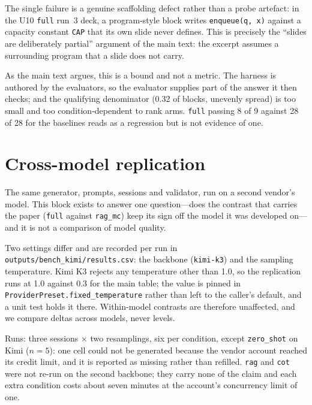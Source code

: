 \documentclass[11pt,a4paper]{article}
\newcommand{\id}[1]{\texttt{#1}}
\begin{document}
The single failure is a genuine scaffolding defect rather than a probe artefact:
in the U10 \id{full} run~3 deck, a program-style block writes
\id{enqueue(q, x)} against a capacity constant \id{CAP} that its own slide never
defines. This is precisely the ``slides are deliberately partial'' argument of
the main text: the excerpt assumes a surrounding program that a slide does not
carry.

As the main text argues, this is a bound and not a metric. The harness is
authored by the evaluators, so the evaluator supplies part of the answer it then
checks; and the qualifying denominator (0.32 of blocks, unevenly spread) is too
small and too condition-dependent to rank arms. \id{full} passing 8 of 9 against
28 of 28 for the baselines reads as a regression but is not evidence of one.

\section{Cross-model replication}
\label{sec:s4}

The same generator, prompts, sessions and validator, run on a second vendor's
model. This block exists to answer one question---does the contrast that carries
the paper (\id{full} against \id{rag\_mc}) keep its sign off the model it was
developed on---and it is not a comparison of model quality.

Two settings differ and are recorded per run in \id{outputs/bench\_kimi/results.csv}:
the backbone (\id{kimi-k3}) and the sampling temperature. Kimi K3 rejects any
temperature other than 1.0, so the replication runs at 1.0 against 0.3 for the
main table; the value is pinned in \id{ProviderPreset.fixed\_temperature} rather
than left to the caller's default, and a unit test holds it there. Within-model
contrasts are therefore unaffected, and we compare deltas across models, never
levels.

Runs: three sessions $\times$ two resamplings, six per condition, except
\id{zero\_shot} on Kimi ($n=5$): one cell could not be generated because the
vendor account reached its credit limit, and it is reported as missing rather
than refilled. \id{rag} and \id{cot} were not re-run on the second backbone; they
carry none of the claim and each extra condition costs about seven minutes at the
account's concurrency limit of one.

\begin{table}[htbp]
\centering
\caption{The same conditions under two backbones. Mean (standard deviation) over
runs; \id{rag} and \id{cot} were not re-run on the second backbone. DeepSeek V4 at
temperature 0.3, Kimi K3 at 1.0 (vendor-pinned), so levels are not comparable
across the two blocks---only deltas within a block are.}
\label{tab:s-cross}
\footnotesize
\setlength{\tabcolsep}{4pt}

\end{table}
\end{document}
